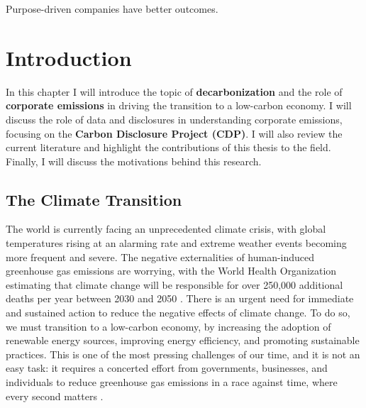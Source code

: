 \begin{savequote}[75mm]
Purpose-driven companies have better outcomes.
\end{savequote}

\chapter{Introduction}

\begin{keytakeaway}
In this chapter I will introduce the topic of \textbf{decarbonization} and the role of \textbf{corporate emissions} in driving the transition to a low-carbon economy. I will discuss the role of data and disclosures in understanding corporate emissions, focusing on the \textbf{Carbon Disclosure Project (CDP)}. I will also review the current literature and highlight the contributions of this thesis to the field. Finally, I will discuss the motivations behind this research.
\end{keytakeaway}

\section{The Climate Transition}
The world is currently facing an unprecedented climate crisis, with global temperatures rising at an alarming rate and extreme weather events becoming more frequent and severe. The negative externalities of human-induced greenhouse gas emissions are worrying, with the World Health Organization estimating that climate change will be responsible for over 250,000 additional deaths per year between 2030 and 2050 \cite{WHO2023}. There is an urgent need for immediate and sustained action to reduce the negative effects of climate change. To do so, we must transition to a low-carbon economy, by increasing the adoption of renewable energy sources, improving energy efficiency, and promoting sustainable practices. This is one of the most pressing challenges of our time, and it is not an easy task: it requires a concerted effort from governments, businesses, and individuals to reduce greenhouse gas emissions in a race against time, where every second matters \cite{Muryani2023Strategies}.

